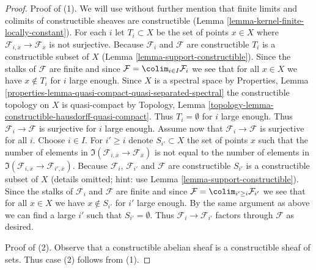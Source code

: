 \begin{proof}
Proof of (1). We will use without further mention that finite limits
and colimits of constructible sheaves are constructible
(Lemma \ref{lemma-kernel-finite-locally-constant}).
For each $i$ let $T_i \subset X$ be the set of points $x \in X$
where $\mathcal{F}_{i, \overline{x}} \to \mathcal{F}_{\overline{x}}$
is not surjective. Because $\mathcal{F}_i$ and $\mathcal{F}$ are
constructible $T_i$ is a constructible subset of $X$
(Lemma \ref{lemma-support-constructible}).
Since the stalks of $\mathcal{F}$ are finite
and since $\mathcal{F} = \colim_{i \in I} \mathcal{F}_i$ we see
that for all $x \in X$ we have $x \not \in T_i$ for $i$ large enough.
Since $X$ is a spectral space by Properties, Lemma
\ref{properties-lemma-quasi-compact-quasi-separated-spectral}
the constructible topology on $X$ is quasi-compact by
Topology, Lemma \ref{topology-lemma-constructible-hausdorff-quasi-compact}.
Thus $T_i = \emptyset$ for $i$ large enough. Thus
$\mathcal{F}_i \to \mathcal{F}$ is surjective for $i$ large enough.
Assume now that $\mathcal{F}_i \to \mathcal{F}$ is surjective for all $i$.
Choose $i \in I$. For $i' \geq i$ denote $S_{i'} \subset X$ the set of
points $x$ such that the number of elements in
$\Im(\mathcal{F}_{i, \overline{x}} \to \mathcal{F}_{\overline{x}})$
is not equal to the number of elements in
$\Im(\mathcal{F}_{i, \overline{x}} \to \mathcal{F}_{i', \overline{x}})$.
Because $\mathcal{F}_i$, $\mathcal{F}_{i'}$ and $\mathcal{F}$ are
constructible $S_{i'}$ is a constructible subset of $X$
(details omitted; hint: use Lemma \ref{lemma-support-constructible}).
Since the stalks of $\mathcal{F}_i$ and $\mathcal{F}$
are finite and since $\mathcal{F} = \colim_{i' \geq i} \mathcal{F}_{i'}$
we see that for all $x \in X$ we have $x \not \in S_{i'}$ for $i'$
large enough. By the same argument as above we can find a large $i'$ such
that $S_{i'} = \emptyset$. Thus $\mathcal{F}_i \to \mathcal{F}_{i'}$
factors through $\mathcal{F}$ as desired.

\medskip\noindent
Proof of (2). Observe that a constructible abelian sheaf is a constructible
sheaf of sets. Thus case (2) follows from (1).


\end{proof}
